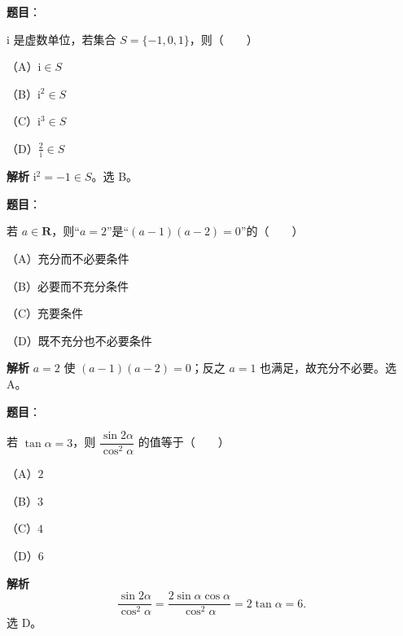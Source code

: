 
\begin{answer}

\textbf{题目}：

$\mathrm i$ 是虚数单位，若集合 $S=\{-1,0,1\}$，则\mbox{（　　）}

（A）$\mathrm i\in S$

（B）$\mathrm i^2\in S$

（C）$\mathrm i^3\in S$

（D）$\frac2{\mathrm i}\in S$

\textbf{解析}
$\mathrm i^2=-1\in S$。选 B。


\end{answer}
\begin{answer}

\textbf{题目}：

若 $a\in\mathbf R$，则“$a=2$”是“$(a-1)(a-2)=0$”的\mbox{（　　）}

（A）充分而不必要条件

（B）必要而不充分条件

（C）充要条件

（D）既不充分也不必要条件

\textbf{解析}
$a=2$ 使 $(a-1)(a-2)=0$；反之 $a=1$ 也满足，故充分不必要。选 A。


\end{answer}
\begin{answer}

\textbf{题目}：

若 $\tan\alpha=3$，则 $\dfrac{\sin2\alpha}{\cos^2\alpha}$ 的值等于\mbox{（　　）}

（A）$2$

（B）$3$

（C）$4$

（D）$6$

\textbf{解析}
\nopagebreak[4]
\[\frac{\sin2\alpha}{\cos^2\alpha}=\frac{2\sin\alpha\cos\alpha}{\cos^2\alpha}=2\tan\alpha=6.\]
选 D。


\end{answer}

